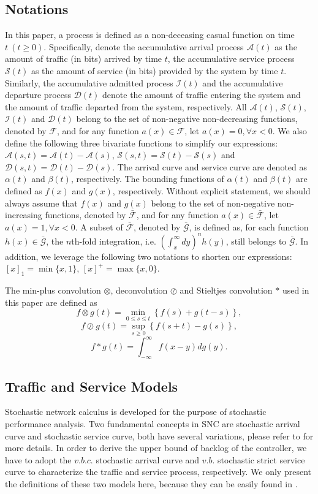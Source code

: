 \documentclass[paper]{ieice}
\begin{document}
\subsection{Notations}\label{notation}
In this paper, a process is defined as a non-deceasing casual function on time $t\ (t\geq 0)$. Specifically, denote the accumulative arrival process $\mathcal{A}(t)$ as the amount of traffic (in bits) arrived by time $t$, the accumulative service process $\mathcal{S}(t)$ as the amount of service (in bits) provided by the system by time $t$. Similarly, the accumulative admitted process $\mathcal{I}(t)$ and the accumulative departure process $\mathcal{D}(t)$ denote the amount of traffic entering the system and the amount of traffic departed from the system, respectively. All $\mathcal{A}(t)$, $\mathcal{S}(t)$, $\mathcal{I}(t)$ and $\mathcal{D}(t)$ belong to the set of non-negative non-decreasing functions, denoted by $\mathcal{F}$, and for any function $a(x)\in\mathcal{F}$, let $a(x)=0,\forall x<0$. We also define the following three bivariate functions to simplify our expressions: $\mathcal{A}(s,t)=\mathcal{A}(t)-\mathcal{A}(s)$, $\mathcal{S}(s,t)=\mathcal{S}(t)-\mathcal{S}(s)$ and $\mathcal{D}(s,t)=\mathcal{D}(t)-\mathcal{D}(s)$. The arrival curve and service curve are denoted as $\alpha(t)$ and $\beta(t)$, respectively. The bounding functions of $\alpha(t)$ and $\beta(t)$ are defined as $f(x)$ and $g(x)$, respectively. Without explicit statement, we should always assume that $f(x)$ and $g(x)$ belong to the set of non-negative non-increasing functions, denoted by $\bar{\mathcal{F}}$, and for any function $a(x)\in\bar{\mathcal{F}}$, let $a(x)=1,\forall x<0$. A subset of $\bar{\mathcal{F}}$, denoted by $\bar{\mathcal{G}}$, is defined as, for each function $h(x)\in\bar{\mathcal{G}}$, the $n$th-fold integration, i.e. $(\int_{x}^\infty dy)^nh(y)$, still belongs to $\bar{\mathcal{G}}$. In addition, we leverage the following two notations to shorten our expressions: $[x]_1=\min\{x,1\}$, $[x]^+=\max\{x,0\}$.

The min-plus convolution $\otimes$, deconvolution $\oslash$ and Stieltjes convolution $\ast$ used in this paper are defined as
$$f\otimes g(t)=\min_{0\leq s\leq t}\left\{f(s)+g(t-s)\right\},$$
$$f\oslash g(t)=\sup_{s\geq 0}\left\{f(s+t)-g(s)\right\},$$
$$f\ast g(t)=\int_{-\infty}^{\infty}f(x-y)dg(y).$$

\subsection{Traffic and Service Models}\label{trafficservice}
Stochastic network calculus is developed for the purpose of stochastic performance analysis. Two fundamental concepts in SNC are stochastic arrival curve and stochastic service curve, both have several variations, please refer to \cite{JiangLiu-15877,jiang2006basic} for more details. In order to derive the upper bound of backlog of the controller, we have to adopt the $v.b.c.$ stochastic arrival curve \cite{jiang2006basic,JiangLiu-15877} and $v.b.$ stochastic strict service curve \cite{Wu2010Model} to characterize the traffic and service process, respectively. We only present the definitions of these two models here, because they can be easily found in \cite{JiangLiu-15877,Wu2010Model,jiang2006basic}.
\end{document}

